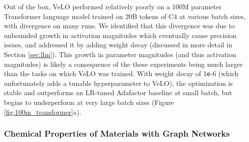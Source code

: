 \documentclass[11pt]{article}
\newcommand{\e}{\texttt{e}}
\begin{document}
Out of the box, VeLO performed relatively poorly on a 100M parameter Transformer language model trained on 20B tokens of C4 \citep{raffel2020exploring} at various batch sizes, with divergence on many runs. We identified that this divergence was due to unbounded growth in activation magnitudes which eventually cause precision issues, and addressed it by adding weight decay (discussed in more detail in Section \ref{sec:llm}). This growth in parameter magnitudes (and thus activation magnitudes) is likely a consequence of the these experiments being much larger than the tasks on which VeLO was trained. With weight decay of 1\e-6 (which unfortunately adds a tunable hyperparameter to VeLO), the optimization is stable and outperforms an LR-tuned Adafactor baseline at small batch, but begins to underperform at very large batch sizes (Figure \ref{fig:100m_transformer}a). 

\subsubsection{Chemical Properties of Materials with Graph Networks}
\label{sec chem gnns}

\end{document}
